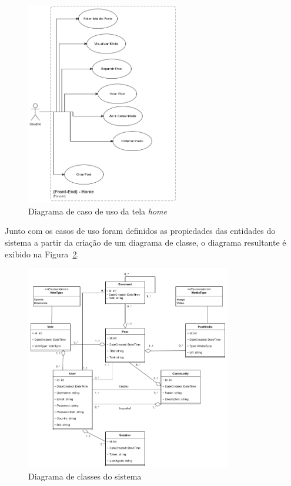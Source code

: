 \documentclass[12pt]{article}
\begin{document}
\begin{figure}[H]
    \centering
    \includegraphics[width=0.6\textwidth]{diagrams/home_diagram.png}
    \caption{Diagrama de caso de uso da tela \textit{home}}\label{fig:home_diagram}
\end{figure}

Junto com os casos de uso foram definidos as propiedades das entidades do sistema
a partir da criação de um diagrama de classe, o diagrama resultante é exibido
na Figura~\ref{fig:classes_diagram}.

\begin{figure}[H]
    \centering
    \includegraphics[width=0.8\textwidth]{diagrams/classes_diagram.png}
    \caption{Diagrama de classes do sistema}\label{fig:classes_diagram}
\end{figure}
\end{document}
